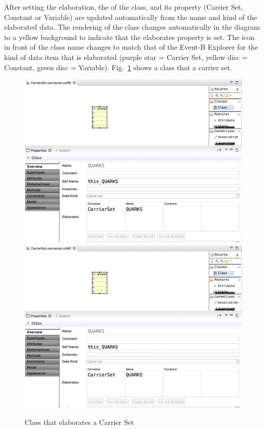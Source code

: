 After setting the elaboration, the  of the class, and its  property (Carrier Set, Constant or Variable) are updated automatically from the name and kind of the elaborated data. 
The rendering of the class changes automatically in the diagram to a yellow background to indicate that the elaborates property is set.
The icon in front of the class name changes to match that of the Event-B Explorer for the kind of data item that is elaborated (purple star = Carrier Set, yellow disc = Constant, green disc = Variable).
Fig.~\ref{fig:ClassElaboration} shows a class that  a carrier set.

\begin{figure}[!htbp]
	\centering
	\ifplastex
	\includegraphics[width=1000]{figures/ClassElaboration.png}
	\else
	\includegraphics[width=1\textwidth]{figures/ClassElaboration.png}
	\fi
	\caption{Class that elaborates a Carrier Set}
	\label{fig:ClassElaboration}
\end{figure}


